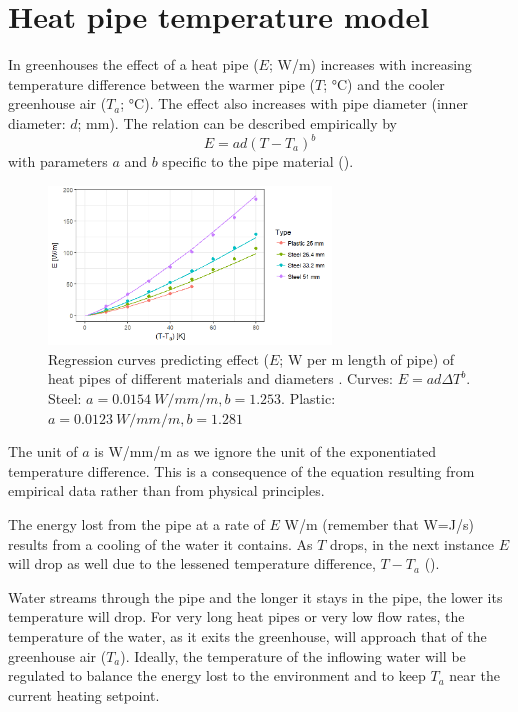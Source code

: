 \chapter{Heat pipe temperature model}

In greenhouses the effect of a heat pipe ($E$; \si{W/m}) increases with increasing temperature difference between the warmer pipe ($T$; \si{\degreeCelsius}) and the cooler greenhouse air ($T_a$; \si{\degreeCelsius}). The effect also increases with pipe diameter (inner diameter: $d$; \si{mm}). The relation can be described empirically by
\begin{equation}
  E=ad\left(T-T_a\right)^b
  \label{eq:vg-heat-pipe-E}
\end{equation}
with parameters $a$ and $b$ specific to the pipe material ().

\begin{figure} [ht]
\centering
\includegraphics[width=0.67\textwidth]{graphics/vg/heat-pipe-regression.png}
\caption{Regression curves predicting effect ($E$; \si{W} per \si{m} length of pipe) of heat pipes of different materials and diameters \citep[after][Table.~4.3.4]{Braak95}. Curves: $E=ad{\Delta T}^b$. Steel: $a=\SI{0.0154}{W/mm/m}, b=1.253$. Plastic: $a=\SI{0.0123}{W/mm/m}, b=1.281$}
\label{fig:vg-heat-pipe-regression}
\end{figure}

The unit of $a$ is \si{W/mm/m} as we ignore the unit of the exponentiated temperature difference. This is a consequence of the equation resulting from empirical data rather than from physical principles.

The energy lost from the pipe at a rate of $E$ \si{W/m} (remember that \si{W}=\si{J/s}) results from a cooling of the water it contains. As $T$ drops, in the next instance $E$ will drop as well due to the lessened temperature difference, $T-T_a$ (). 

Water streams through the pipe and the longer it stays in the pipe, the lower its temperature will drop. For very long heat pipes or very low flow rates, the temperature of the water, as it exits the greenhouse, will approach that of the greenhouse air ($T_a$). Ideally, the temperature of the inflowing water will be regulated to balance the energy lost to the environment and to keep $T_a$ near the current heating setpoint.

